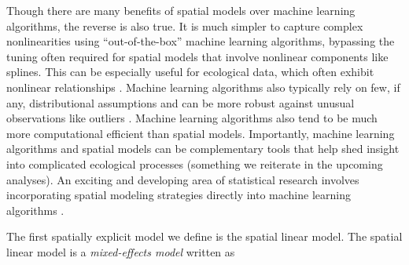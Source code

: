 \documentclass[
  letterpaper,
  DIV=11,
  numbers=noendperiod]{scrartcl}
\begin{document}
Though there are many benefits of spatial models over machine learning
algorithms, the reverse is also true. It is much simpler to capture
complex nonlinearities using ``out-of-the-box'' machine learning
algorithms, bypassing the tuning often required for spatial models that
involve nonlinear components like splines. This can be especially useful
for ecological data, which often exhibit nonlinear relationships
\citep{fox2017assessing}. Machine learning algorithms also typically
rely on few, if any, distributional assumptions and can be more robust
against unusual observations like outliers \citep{hastie2009elements}.
Machine learning algorithms also tend to be much more computational
efficient than spatial models. Importantly, machine learning algorithms
and spatial models can be complementary tools that help shed insight
into complicated ecological processes (something we reiterate in the
upcoming analyses). An exciting and developing area of statistical
research involves incorporating spatial modeling strategies directly
into machine learning algorithms
\citep{saha2023random, heaton2025scalable}.

The first spatially explicit model we define is the spatial linear
model. The spatial linear model is a \emph{mixed-effects model}
\citep{pinheiro2000mixed, bolker2015linear} written as
\end{document}
